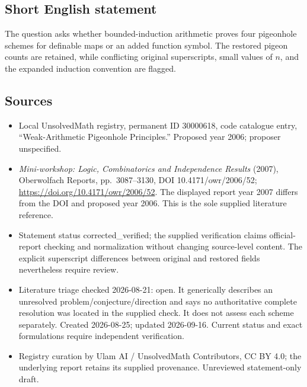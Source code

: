 \documentclass[11pt]{article}
\begin{document}
\subsection{Short English statement}
The question asks whether bounded-induction arithmetic proves four pigeonhole schemes for definable maps or an added function symbol. The restored pigeon counts are retained, while conflicting original superscripts, small values of $n$, and the expanded induction convention are flagged.
\subsection{Sources}
\begin{itemize}
\item Local UnsolvedMath registry, permanent ID 30000618, code catalogue entry, ``Weak-Arithmetic Pigeonhole Principles.'' Proposed year 2006; proposer unspecified.
\item \emph{Mini-workshop: Logic, Combinatorics and Independence Results} (2007), Oberwolfach Reports, pp.\ 3087--3130, DOI 10.4171/owr/2006/52; \url{https://doi.org/10.4171/owr/2006/52}. The displayed report year 2007 differs from the DOI and proposed year 2006. This is the sole supplied literature reference.
\item Statement status corrected\_verified; the supplied verification claims official-report checking and normalization without changing source-level content. The explicit superscript differences between original and restored fields nevertheless require review.
\item Literature triage checked 2026-08-21: open. It generically describes an unresolved problem/conjecture/direction and says no authoritative complete resolution was located in the supplied check. It does not assess each scheme separately. Created 2026-08-25; updated 2026-09-16. Current status and exact formulations require independent verification.
\item Registry curation by Ulam AI / UnsolvedMath Contributors, CC BY 4.0; the underlying report retains its supplied provenance. Unreviewed statement-only draft.
\end{itemize}
\end{document}
